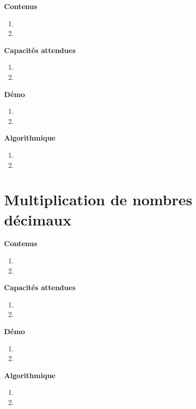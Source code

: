 \documentclass[10pt,a4paper]{article}
\begin{document}
\textbf{Contenus}

\begin{enumerate} 
\item 
\item 
\end{enumerate}


\textbf{Capacités attendues}

\begin{enumerate}
\item 
\item 
\end{enumerate}

\textbf{Démo}

\begin{enumerate}
\item 
\item 
\end{enumerate}

\textbf{Algorithmique}

\begin{enumerate}
\item 
\item 
\end{enumerate}

\section{Multiplication de nombres décimaux}

\textbf{Contenus}

\begin{enumerate} 
\item 
\item 
\end{enumerate}


\textbf{Capacités attendues}

\begin{enumerate}
\item 
\item 
\end{enumerate}

\textbf{Démo}

\begin{enumerate}
\item 
\item 
\end{enumerate}

\textbf{Algorithmique}

\begin{enumerate}
\item 
\item 
\end{enumerate}
\end{document}
